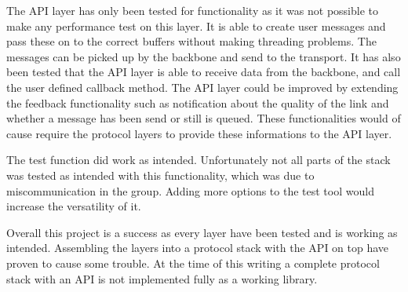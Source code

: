 The API layer has only been tested for functionality as it was not possible to make any performance test on this layer. It is able to create user messages and pass these on to the correct buffers without making threading problems. The messages can be picked up by the backbone and send to the transport. It has also been tested that the API layer is able to receive data from the backbone, and call the user defined callback method. The API layer could be improved by extending the feedback functionality such as notification about the quality of the link and whether a message has been send or still is queued. These functionalities would of cause require the protocol layers to provide these informations to the API layer.

The test function did work as intended. Unfortunately not all parts of the stack was tested as intended with this functionality, which was due to miscommunication in the group. Adding more options to the test tool would increase the versatility of it.

Overall this project is a success as every layer have been tested and is working as intended. Assembling the layers into a protocol stack with the API on top have proven to cause some trouble. At the time of this writing a complete protocol stack with an API is not implemented fully as a working library.